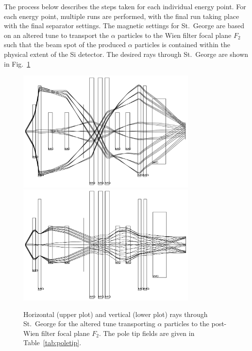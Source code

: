 The process below describes the steps taken for each individual energy
point. For each energy point, multiple runs are performed, with the
final run taking place with the final separator settings. The magnetic
settings for St.\ George are based on an altered tune to transport the
$\alpha$ particles to the Wien filter focal plane $F_2$ such that the
beam spot of the produced $\alpha$ particles is contained within the
physical extent of the Si detector. The desired rays through St.\ George
are shown in Fig.~\ref{fig:raytrace-altered}

\begin{figure}
    \begin{center}
        \label{fig:raytrace-altered}
        \centerline{
            \includegraphics[width=0.8\textwidth]{figures/optimal_tune_x.png} \\
            \includegraphics[width=0.8\textwidth]{figures/optimal_tune_y.png}
        }
        \caption[Horizontal and vertical rays through St.\
            George for $\alpha$ particles]{Horizontal (upper plot) and
            vertical (lower plot) rays through St.\ George for the
            altered tune transporting $\alpha$ particles to the
            post-Wien filter focal plane $F_2$. The pole tip fields are
            given in Table~\ref{tab:poletip}.}
    \end{center}
\end{figure}

